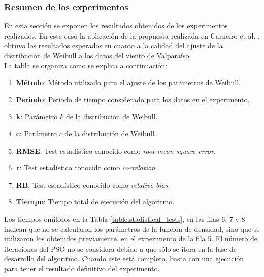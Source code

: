 \subsubsection{Resumen de los experimentos}
En esta sección se exponen los resultados obtenidos de los experimentos realizados. En este caso la aplicación de la propuesta realizada en Carneiro et al. \cite{Carneiro15}, obtuvo los resultados esperados en cuanto a la calidad del ajuste de la distribución de Weibull a los datos del viento de Valparaíso.\\
La tabla se organiza como se explica a continuación:
\begin{enumerate}
  \item \textbf{Método}: Método utilizado para el ajuste de los parámetros de Weibull.
  \item \textbf{Periodo}: Periodo de tiempo considerado para los datos en el experimento.
  \item \textbf{k}: Parámetro $k$ de la distribución de Weibull.
  \item \textbf{c}: Parámetro $c$ de la distribución de Weibull.
  \item \textbf{RMSE}: Test estadístico conocido como \emph{root mean square error}.
  \item \textbf{r}: Test estadístico conocido como \emph{correlation}.
  \item \textbf{RB}: Test estadístico conocido como \emph{relative bias}.
  \item \textbf{Tiempo}: Tiempo total de ejecución del algoritmo.
\end{enumerate}
Los tiempos omitidos en la Tabla \ref{table:stadistical_tests}, en las filas 6, 7 y 8 indican que no se calcularon los parámetros de la función de densidad, sino que se utilizaron los obtenidos previamente, en el experimento de la fila 5. El número de iteraciones del PSO no se considera debido a que sólo se itera en la fase de desarrollo del algoritmo. Cuando este está completo, basta con una ejecución para tener el resultado definitivo del experimento.
